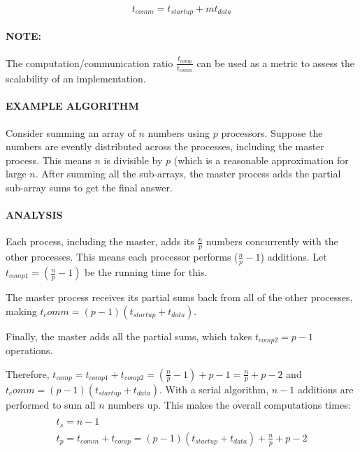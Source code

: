\documentclass{article}
\begin{document}
\begin{equation}
	t_{comm} = t_{startup} + m t_{data}
	\label{eq:time-comm-formula}
\end{equation}

\paragraph{\textbf{NOTE:}} The computation/communication ratio $\frac{t_{comp}}{t_{comm}}$ can be used as a metric to assess the scalability of an implementation.

\paragraph{\textbf{EXAMPLE ALGORITHM}} Consider summing an array of $n$ numbers using $p$ processors. Suppose the numbers are evently distributed across the processes, including the master process. This means $n$ is divisible by $p$ (which is a reasonable approximation for large $n$. After summing all the sub-arrays, the master process adds the partial sub-array sums to get the final answer.

\paragraph{\textbf{ANALYSIS}} Each process, including the master, adds its $\frac{n}{p}$ numbers concurrently with the other processes. This means each processor performs ($\frac{n}{p} - 1$) additions. Let $t_{comp1} = (\frac{n}{p} - 1)$ be the running time for this.

The master process receives its partial sums back from all of the other processes, making $t_comm = (p - 1)(t_{startup} + t_{data})$.

Finally, the master adds all the partial sums, which takes $t_{comp2} = p - 1$ operations.

Therefore, $t_{comp} = t_{comp1} + t_{comp2} = (\frac{n}{p} - 1) + p - 1 = \frac{n}{p} + p - 2$ and $t_comm = (p - 1)(t_{startup} + t_{data})$. With a serial algorithm, $n - 1$ additions are performed to sum all $n$ numbers up. This makes the overall computations times:
\begin{multline}\\
	t_s = n - 1 \\
	t_p = t_{comm} + t_{comp} = (p - 1)(t_{startup} + t_{data}) + \frac{n}{p} + p - 2 \\
\end{multline}
\end{document}
